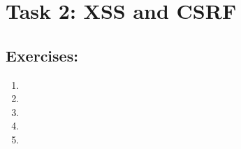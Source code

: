 \section*{Task 2: XSS and CSRF}
\subsection*{Exercises:}
\begin{enumerate}
\item
\item
\item
\item \highergradesonly
\item \highergradesonly
\end{enumerate}
